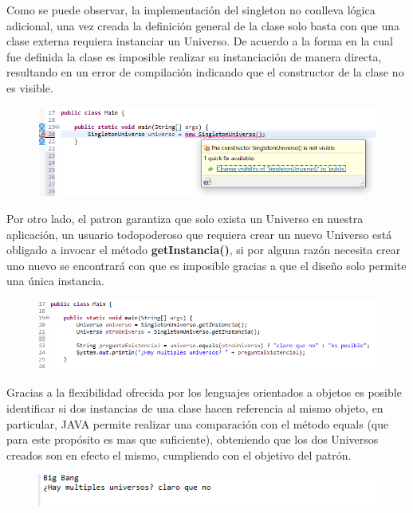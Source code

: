 Como se puede observar, la implementación del singleton no conlleva lógica adicional, una vez creada la definición general de la clase solo basta con que una clase externa requiera instanciar un Universo. De acuerdo a la forma en la cual fue definida la clase es imposible realizar su instanciación de manera directa, resultando en un error de compilación indicando que el constructor de la clase no es visible.

\begin{figure}[H]
	\includegraphics{images/creational/singleton/singletonExample3.png}
\end{figure}

Por otro lado, el patron garantiza que solo exista un Universo en nuestra aplicación, un usuario todopoderoso que requiera crear un nuevo Universo está obligado a invocar el método \textbf{getInstancia()}, si por alguna razón necesita crear uno nuevo se encontrará con que es imposible gracias a que el diseño solo permite una única instancia.

\begin{figure}[H]
	\includegraphics{images/creational/singleton/singletonExample4.png}
\end{figure}

Gracias a la flexibilidad ofrecida por los lenguajes orientados a objetos es posible identificar si dos instancias de una clase hacen referencia al mismo objeto, en particular, JAVA permite realizar una comparación con el método equals (que para este propósito es mas que suficiente), obteniendo que los dos Universos creados son en efecto el mismo, cumpliendo con el objetivo del patrón.

\begin{figure}[H]
	\includegraphics{images/creational/singleton/singletonExample5.png}
\end{figure}

